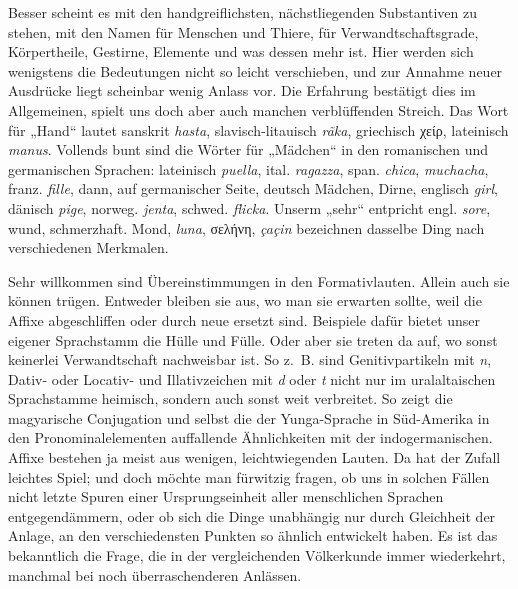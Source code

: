 \largerpage[-1]Besser scheint es mit den handgreiflichsten, nächstliegenden Sub\label{fp.163}stantiven zu stehen, mit den Namen für Menschen und Thiere, für Verwandtschaftsgrade, Körpertheile, Gestirne, Elemente und was dessen mehr ist. Hier werden sich wenigstens die Bedeutungen nicht so leicht verschieben, und zur Annahme neuer Ausdrücke liegt scheinbar wenig Anlass vor. Die Erfahrung bestätigt dies im Allgemeinen, spielt uns doch aber auch manchen verblüffenden Streich. Das Wort für „Hand“ lautet sanskrit \textit{hasta}, slavisch-litauisch \textit{rãka}, griechisch χείρ, lateinisch \textit{manus}. Vollends bunt sind die Wörter für „Mädchen“ in den romanischen und germanischen Sprachen: lateinisch \textit{puella}, ital. \textit{ragazza}, span. \textit{chica}, \textit{muchacha}, franz. \textit{fille}, dann, auf germanischer Seite, deutsch Mädchen, Dirne, englisch \textit{girl}, dänisch \textit{pige}, norweg. \textit{jenta}, schwed. \textit{flicka}. Unserm „sehr“ entpricht engl. \textit{sore}, wund, schmerzhaft. Mond, \textit{luna}, σελήνη, \textit{çaçin} bezeichnen dasselbe Ding nach verschiedenen Merkmalen.

Sehr willkommen sind Übereinstimmungen in den Formativlauten. Allein auch sie können trügen. Entweder bleiben sie aus, wo man sie erwarten sollte, weil die Affixe abgeschliffen oder durch neue ersetzt sind. Beispiele dafür bietet unser eigener Sprachstamm die Hülle und Fülle. Oder aber sie treten da auf, wo sonst keinerlei Verwandtschaft nachweisbar ist. So z.~B. sind Genitivpartikeln mit \textit{n}, Dativ- oder Locativ- und Illativzeichen mit \textit{d} oder \textit{t} nicht nur im uralaltaischen Sprachstamme heimisch, sondern auch sonst weit verbreitet. So zeigt die magyarische Conjugation und selbst die der Yunga-Sprache in Süd-Amerika in den Pronominalelementen auffallende Ähnlichkeiten mit der indogermanischen. Affixe bestehen ja meist aus wenigen, leichtwiegenden Lauten. Da hat der Zufall leichtes Spiel; und doch möchte man fürwitzig fragen, ob uns in solchen Fällen nicht letzte Spuren einer Ursprungseinheit aller menschlichen Sprachen entgegendämmern, oder ob sich die Dinge unabhängig  nur durch Gleichheit der Anlage, an den verschiedensten Punkten so ähnlich entwickelt haben. Es ist das bekanntlich die Frage, die in der vergleichenden Völkerkunde immer wiederkehrt, manchmal bei noch überraschenderen Anlässen.

